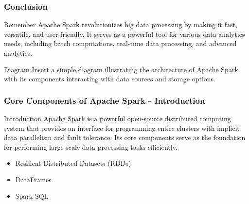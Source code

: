 \documentclass[aspectratio=169]{beamer}
\begin{document}
\begin{frame}[fragile]
    \frametitle{Conclusion}
    \begin{block}{Remember}
        Apache Spark revolutionizes big data processing by making it fast, versatile, and user-friendly. It serves as a powerful tool for various data analytics needs, including batch computations, real-time data processing, and advanced analytics.
    \end{block}
    \begin{block}{Diagram}
        Insert a simple diagram illustrating the architecture of Apache Spark with its components interacting with data sources and storage options.
    \end{block}
\end{frame}

\begin{frame}[fragile]
    \frametitle{Core Components of Apache Spark - Introduction}
    \begin{block}{Introduction}
        Apache Spark is a powerful open-source distributed computing system that provides an interface for programming entire clusters with implicit data parallelism and fault tolerance. Its core components serve as the foundation for performing large-scale data processing tasks efficiently.
    \end{block}
    \begin{itemize}
        \item Resilient Distributed Datasets (RDDs)
        \item DataFrames
        \item Spark SQL
    \end{itemize}
\end{frame}
\end{document}
